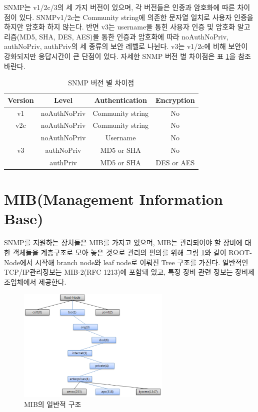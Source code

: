 \documentclass[11pt
  , a4paper
  , article
  , oneside
]{memoir}
\begin{document}
\hfil\break
\hfil\break
\hfil\break
\hfil\break

SNMP는 v1/2c/3의 세 가지 버전이 있으며, 각 버전들은 인증과 암호화에 따른 차이점이 있다. SNMPv1/2c는 Community string에 의존한 문자열 일치로 사용자 인증을 하지만 암호화 하지 않는다. 반면 v3는 username을 통힌 사용자 인증 및 암호화 알고리즘(MD5, SHA, DES, AES)을 통한 인증과 암호화에 따라 noAuthNoPriv, authNoPriv, authPriv의 세 종류의 보안 레벨로 나뉜다. v3는 v1/2c에 비해 보안이 강화되지만 응답시간이 큰 단점이 있다. 자세한 SNMP 버전 별 차이점은 표 \ref{table:conparision}\citep{comparison}을 참조바란다.

\begin{table}[h!]
\begin{center}
\begin{tabular}{c|c|c|c}\hline
Version & Level & Authentication & Encryption \\ \hline
v1 & noAuthNoPriv & Community string & No \\ \hline
v2c & noAuthNoPriv & Community string & No \\ \hline
 & noAuthNoPriv & Username & No \\ \cline{2-4}
v3 & authNoPriv & MD5 or SHA & No \\ \cline{2-4}
 & authPriv & MD5 or SHA & DES or AES \\ \hline
\end{tabular}
\caption{SNMP 버전 별 차이점}
  \label{table:conparision} 
\end{center}
\end{table} 

\clearpage
\section{MIB(Management Information Base)}
SNMP를 지원하는 장치들은 MIB를 가지고 있으며, MIB는 관리되어야 할 장비에 대한 객체들을 계층구조로 모아 놓은 것으로 관리의 편의를 위해 그림 \ref{fig:oid_tree}와 같이 ROOT-Node에서 시작해 branch node와 leaf node로 이뤄진 Tree 구조를 가진다. 일반적인 TCP/IP관리정보는 MIB-2(RFC 1213)에 포함돼 있고, 특정 장비 관련 정보는 장비제조업체에서 제공한다. 

\begin{figure}[h!]
  \centering
  \includegraphics[width=0.65\textwidth]{./images/oid_tree.eps}
  \caption{MIB의 일반적 구조}
  \label{fig:oid_tree} 
\end{figure}
\end{document}
